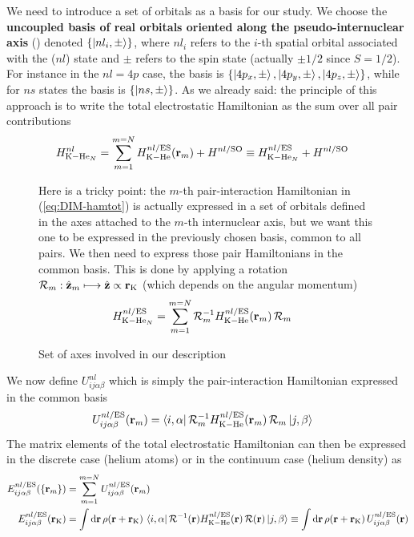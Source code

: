 We need to introduce a set of orbitals as a basis for our study. We choose the \textbf{uncoupled basis of real orbitals oriented along the pseudo-internuclear axis} () denoted $\{\ket{nl_i,\pm}\}$, where $nl_i$ refers to the $i$-th spatial orbital associated with the ($nl$) state and $\pm$ refers to the spin state (actually $\pm 1/2$ since $S=1/2$). For instance in the $nl=4p$ case, the basis is $\{\ket{4p_x,\pm}, \ket{4p_y,\pm}, \ket{4p_z,\pm} \}$, while for $ns$ states the basis is $\{\ket{ns,\pm}\}$.
As we already said: the principle of this approach is to write the total electrostatic Hamiltonian as the sum over all pair contributions 
\begin{align}
H^{nl}_{\mathrm{K-He}_N} &= \sum_{m=1}^{m=N} H^{nl/\mathrm{ES}}_{\mathrm{K-He}}(\vb{r}_m) + H^{nl/\mathrm{SO}} \equiv H^{nl/\mathrm{ES}}_{\mathrm{K-He}_N} + H^{nl/\mathrm{SO}}\label{eq:DIM-hamtot}
\end{align}
%
\begin{figure}[h!]
\begin{minipage}[c]{.55\linewidth}
\hspace{\oldindent}
Here is a tricky point:  the $m$-th pair-interaction Hamiltonian in (\ref{eq:DIM-hamtot}) is actually expressed in a set of orbitals defined in the axes attached to the $m$-th internuclear axis, but we want this one to be expressed in the previously chosen basis, common to all pairs.
We then need to express those pair Hamiltonians in the common basis.
This is done by applying a rotation $\mathcal{R}_m:\hat{\vb{z}}_m \longmapsto  \hat{\vb{z}} \propto \vb{r}_{\mathrm{K}}$ (which depends on the angular momentum)
\begin{align}
H^{nl/\mathrm{ES}}_{\mathrm{K-He}_N} &= \sum_{m=1}^{m=N} \mathcal{R}_m^{-1} H^{nl/\mathrm{ES}}_{\mathrm{K-He}}(\vb{r}_m) \, \mathcal{R}_m
\end{align}
\end{minipage} \hfill
\begin{minipage}[c]{.40\linewidth} 
\caption{Set of axes involved in our description\label{fig:DIM-axis}}
\end{minipage}
\end{figure}

We now define $U^{nl}_{ij\alpha\beta}$ which is simply the pair-interaction Hamiltonian expressed in the common basis
\begin{align}
U^{nl/\mathrm{ES}}_{ij\alpha\beta}(\vb{r}_m) &= \bra{i,\alpha} \mathcal{R}_m^{-1} H^{nl/\mathrm{ES}}_{\mathrm{K-He}}(\vb{r}_m) \, \mathcal{R}_m \ket{j,\beta}
\end{align}
The matrix elements of the total electrostatic Hamiltonian can then be expressed in the discrete case (helium atoms) or in the continuum case (helium density) as
\begin{align}
E^{nl/\mathrm{ES}}_{ij\alpha\beta}(\{\vb{r}_m\}) &= \sum_{m=1}^{m=N} U^{nl/\mathrm{ES}}_{ij\alpha\beta}(\vb{r}_m) \\
E^{nl/\mathrm{ES}}_{ij\alpha\beta} (\vb{r}_{\mathrm{K}}) &= \int \dd{\vb{r}} \rho(\vb{r} + \vb{r}_{\mathrm{K}}) \, \bra{i,\alpha} \mathcal{R}^{-1}(\vb{r}) H^{nl/\mathrm{ES}}_{\mathrm{K-He}}(\vb{r}) \, \mathcal{R}(\vb{r}) \ket{j,\beta} \equiv \int \dd{\vb{r}} \rho(\vb{r} + \vb{r}_{\mathrm{K}}) \, U_{ij\alpha\beta}^{nl/\mathrm{ES}}(\vb{r}) \label{eq:DIM-defE}
\end{align}

